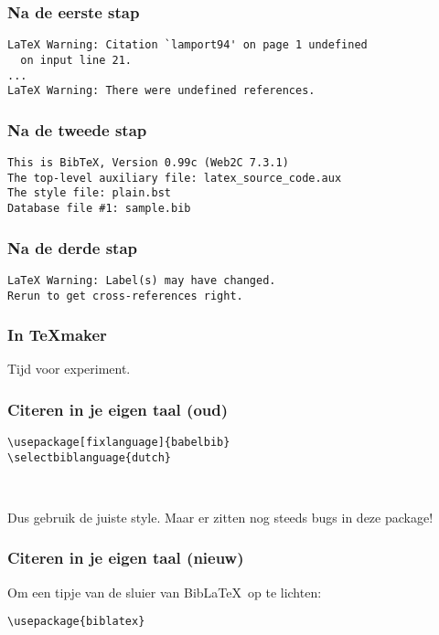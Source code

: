\begin{frame}[fragile]
  \frametitle{Na de eerste stap}
  \begin{verbatim}
LaTeX Warning: Citation `lamport94' on page 1 undefined
  on input line 21.
...
LaTeX Warning: There were undefined references.\end{verbatim}
\end{frame}

\begin{frame}[fragile]
  \frametitle{Na de tweede stap}
  \begin{verbatim}
This is BibTeX, Version 0.99c (Web2C 7.3.1)
The top-level auxiliary file: latex_source_code.aux
The style file: plain.bst
Database file #1: sample.bib\end{verbatim}
\end{frame}

\begin{frame}[fragile]
  \frametitle{Na de derde stap}
  \begin{verbatim}
LaTeX Warning: Label(s) may have changed.
Rerun to get cross-references right. 
  \end{verbatim}
\end{frame}

\begin{frame}
  \frametitle{In \TeX maker}

  Tijd voor experiment.
\end{frame}

\begin{frame}[fragile]
  \frametitle{Citeren in je eigen taal (oud)}

  \begin{verbatim}
\usepackage[fixlanguage]{babelbib}
\selectbiblanguage{dutch}



  \end{verbatim}
  Dus gebruik de juiste style. Maar er zitten nog steeds bugs in deze package!
\end{frame}

\begin{frame}[fragile]
  \frametitle{Citeren in je eigen taal (nieuw)}

  Om een tipje van de sluier van Bib\LaTeX\ op te lichten:

  \begin{verbatim}
\usepackage{biblatex}


  \end{verbatim}
\end{frame}

